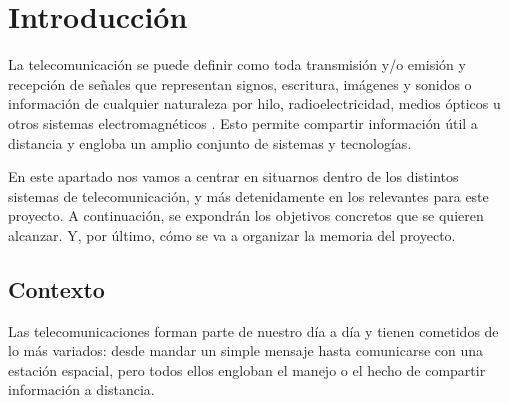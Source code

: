 
\chapter{Introducción}
\label{introduccion}
\par La telecomunicación se puede definir como toda transmisión y/o emisión y recepción de señales que representan signos, escritura, imágenes y sonidos o información de cualquier naturaleza por hilo, radioelectricidad, medios ópticos u otros sistemas electromagnéticos \cite{RAI}. Esto permite compartir información útil a distancia y engloba un amplio conjunto de sistemas y tecnologías. 
\\
\par En este apartado nos vamos a centrar en situarnos dentro de los distintos sistemas de telecomunicación, y más detenidamente en los relevantes para este proyecto. A continuación, se expondrán los objetivos concretos que se quieren alcanzar. Y, por último, cómo se va a organizar la memoria del proyecto. 

\section{Contexto}
\par Las telecomunicaciones forman parte de nuestro día a día y tienen cometidos de lo más variados: desde mandar un simple mensaje hasta comunicarse con una estación espacial, pero todos ellos engloban el manejo o el hecho de compartir información a distancia. 

